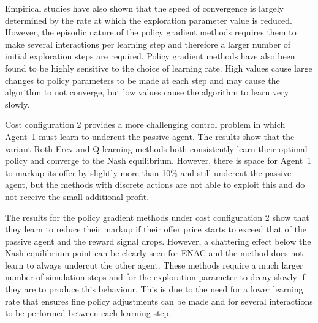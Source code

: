 Empirical studies have also shown that the speed of convergence is largely
determined by the rate at which the exploration parameter value is reduced.
However, the episodic nature of the policy gradient methods requires them to
make several interactions per learning step and therefore a larger number of
initial exploration steps are required.  Policy gradient methods have also
been found to be highly sensitive to the choice of learning rate.  High
values cause large changes to policy parameters to be made at each step and
may cause the algorithm to not converge, but low values cause the
algorithm to learn very slowly.

Cost configuration 2 provides a more challenging control problem in which
Agent~1 must learn to undercut the passive agent.  The results show that the
variant Roth-Erev and Q-learning methods both consistently learn their optimal
policy and converge to the Nash equilibrium.  However, there is space for
Agent~1 to markup its offer by slightly more than 10\% and still undercut the
passive agent, but the methods with discrete actions are not able to exploit
this and do not receive the small additional profit.

The results for the policy gradient methods under cost configuration 2 show that
they learn to reduce their markup if their offer price starts to exceed that of
the passive agent and the reward signal drops.  However, a chattering effect
below the Nash equilibrium point can be clearly seen for ENAC and the method
does not learn to always undercut the other agent.  These methods require a much
larger number of simulation steps and for the exploration parameter to decay
slowly if they are to produce this behaviour.  This is due to the need for a
lower learning rate that ensures fine policy adjustments can be made and for
several interactions to be performed between each learning step.

